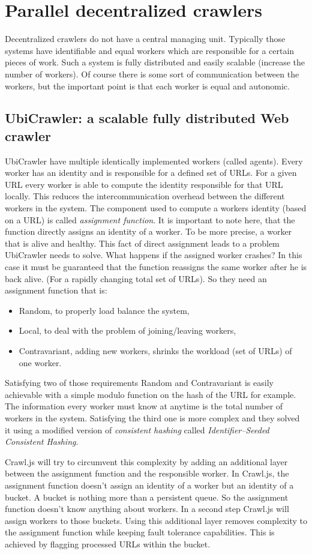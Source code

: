 \section{Parallel decentralized crawlers}
Decentralized crawlers do not have a central managing unit. Typically those systems have identifiable and equal workers which are responsible for a certain pieces of work. Such a system is fully distributed and easily scalable (increase the number of workers). Of course there is some sort of communication between the workers, but the important point is that each worker is equal and autonomic.

\subsection{UbiCrawler: a scalable fully distributed Web crawler \cite{ubicrawler}}
UbiCrawler have multiple identically implemented workers (called agents). Every worker has an identity and is responsible for a defined set of URLs. For a given URL every worker is able to compute the identity responsible for that URL locally. This reduces the intercommunication overhead between the different workers in the system. The component used to compute a workers identity (based on a URL) is called \emph{assignment function}. It is important to note here, that the function directly assigns an identity of a worker. To be more precise, a worker that is alive and healthy. This fact of direct assignment leads to a problem UbiCrawler needs to solve. What happens if the assigned worker crashes? In this case it must be guaranteed that the function reassigns the same worker after he is back alive. (For a rapidly changing total set of URLs). So they need an assignment function that is:
\begin{itemize}
\item Random, to properly load balance the system,
\item Local, to deal with the problem of joining/leaving workers,
\item Contravariant, adding new workers, shrinks the workload (set of URLs) of one worker.
\end{itemize}
Satisfying two of those requirements Random and Contravariant is easily achievable with a simple modulo function on the hash of the URL for example. The information every worker must know at anytime is the total number of workers in the system. Satisfying the third one is more complex and they solved it using a modified version of \emph{consistent hashing} called \emph{Identifier–Seeded Consistent Hashing}. 

Crawl.js will try to circumvent this complexity by adding an additional layer between the assignment function and the responsible worker. In Crawl.js, the assignment function doesn't assign an identity of a worker but an identity of a bucket. A bucket is nothing more than a persistent queue. So the assignment function doesn't know anything about workers. In a second step Crawl.js will assign workers to those buckets. Using this additional layer removes complexity to the assignment function while keeping fault tolerance capabilities. This is achieved by flagging processed URLs within the bucket.
